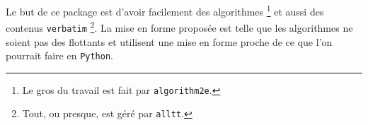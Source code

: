 Le but de ce package est d'avoir facilement des algorithmes
\footnote{
	Le gros du travail est fait par \texttt{algorithm2e}.
}
et aussi des contenus \verb+verbatim+
\footnote{
	Tout, ou presque, est géré par \texttt{alltt}.
}.
La mise en forme proposée est telle que les algorithmes ne soient pas des flottants et utilisent une mise en forme proche de ce que l'on pourrait faire en \verb+Python+.
